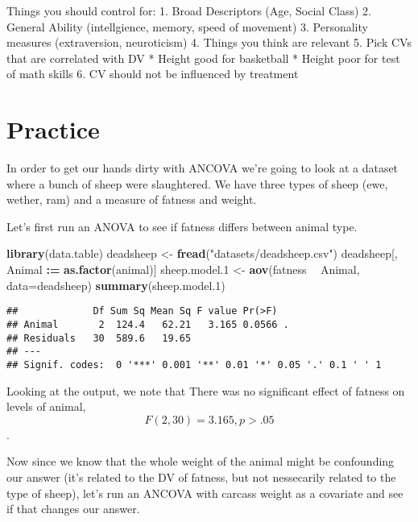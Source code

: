 \documentclass[]{book}
\newenvironment{Shaded}{\begin{snugshade}}{\end{snugshade}}
\newcommand{\KeywordTok}[1]{\textcolor[rgb]{0.13,0.29,0.53}{\textbf{#1}}}
\newcommand{\DataTypeTok}[1]{\textcolor[rgb]{0.13,0.29,0.53}{#1}}
\newcommand{\DecValTok}[1]{\textcolor[rgb]{0.00,0.00,0.81}{#1}}
\newcommand{\StringTok}[1]{\textcolor[rgb]{0.31,0.60,0.02}{#1}}
\newcommand{\OperatorTok}[1]{\textcolor[rgb]{0.81,0.36,0.00}{\textbf{#1}}}
\newcommand{\ErrorTok}[1]{\textcolor[rgb]{0.64,0.00,0.00}{\textbf{#1}}}
\newcommand{\NormalTok}[1]{#1}
\theoremstyle{definition}
\theoremstyle{definition}
\theoremstyle{definition}
\theoremstyle{remark}
\begin{document}
Things you should control for: 1. Broad Descriptors (Age, Social Class)
2. General Ability (intellgience, memory, speed of movement) 3.
Personality measures (extraversion, neuroticism) 4. Things you think are
relevant 5. Pick CVs that are correlated with DV * Height good for
basketball * Height poor for test of math skills 6. CV should not be
influenced by treatment

\section{Practice}\label{practice}

In order to get our hands dirty with ANCOVA we're going to look at a
dataset where a bunch of sheep were slaughtered. We have three types of
sheep (ewe, wether, ram) and a measure of fatness and weight.

Let's first run an ANOVA to see if fatness differs between animal type.

\begin{Shaded}
\begin{Highlighting}[]
\KeywordTok{library}\NormalTok{(data.table)}
\NormalTok{deadsheep <-}\StringTok{ }\KeywordTok{fread}\NormalTok{(}\StringTok{"datasets/deadsheep.csv"}\NormalTok{)}
\NormalTok{deadsheep[, Animal }\OperatorTok{:}\ErrorTok{=}\StringTok{ }\KeywordTok{as.factor}\NormalTok{(animal)]}
\NormalTok{sheep.model.}\DecValTok{1}\NormalTok{ <-}\StringTok{ }\KeywordTok{aov}\NormalTok{(fatness }\OperatorTok{~}\StringTok{ }\NormalTok{Animal, }\DataTypeTok{data=}\NormalTok{deadsheep)}
\KeywordTok{summary}\NormalTok{(sheep.model.}\DecValTok{1}\NormalTok{)}
\end{Highlighting}
\end{Shaded}

\begin{verbatim}
##             Df Sum Sq Mean Sq F value Pr(>F)  
## Animal       2  124.4   62.21   3.165 0.0566 .
## Residuals   30  589.6   19.65                 
## ---
## Signif. codes:  0 '***' 0.001 '**' 0.01 '*' 0.05 '.' 0.1 ' ' 1
\end{verbatim}

Looking at the output, we note that There was no significant effect of
fatness on levels of animal, \[F(2,30)=3.165, p > .05\].

Now since we know that the whole weight of the animal might be
confounding our answer (it's related to the DV of fatness, but not
nessecarily related to the type of sheep), let's run an ANCOVA with
carcass weight as a covariate and see if that changes our answer.
\end{document}
